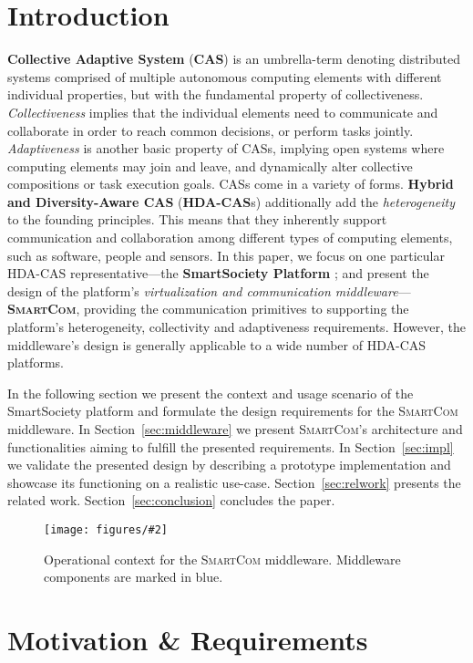 \documentclass{llncs}
\newcommand{\mdl}{\textsc{SmartCom}}
\newcommand{\figcol}[3][0.9]{
\begin{figure}[H] %
\centering
\texttt{[image: figures/\#2]}
\caption{#3}
\label{fig:#2}
\end{figure}
}
\begin{document}
\section{Introduction}
\label{sec:intro}

  \textbf{Collective Adaptive System} (\textbf{CAS}) \cite{FoCASBook} is an umbrella-term denoting distributed systems comprised of multiple autonomous computing elements with different individual properties, but with the fundamental property of collectiveness. \emph{Collectiveness} implies that the individual elements need to communicate and collaborate in order to reach common decisions, or perform tasks jointly. \emph{Adaptiveness} is another basic property of CASs, implying open systems where computing elements may join and leave, and dynamically alter collective compositions or task execution goals. 
  CASs come in a variety of forms. \textbf{Hybrid and Diversity-Aware CAS} (\textbf{HDA-CAS}s) \cite{fausto} additionally add the \emph{heterogeneity} to the founding principles. This means that they inherently support communication and collaboration among different types of computing elements, such as software, people and sensors. 
  In this paper, we focus on one particular HDA-CAS representative---the \textbf{SmartSociety Platform} \cite{SmartSocBook}; and present the design of the platform's \emph{virtualization and communication middleware}---\textbf{\mdl{}}, providing the communication primitives to supporting the platform's heterogeneity, collectivity and adaptiveness requirements. However, the middleware's design is generally applicable to a wide number of HDA-CAS platforms.

  
  In the following section we present the context and usage scenario of the SmartSociety platform and formulate the design requirements for the \mdl{} middleware. In Section~\ref{sec:middleware} we present \mdl's architecture and functionalities aiming to fulfill the presented requirements. In Section~\ref{sec:impl} we validate the presented design by describing a prototype implementation and showcase its functioning on a realistic use-case. Section~\ref{sec:relwork} presents the related work. Section~\ref{sec:conclusion} concludes the paper.

  \figcol[1.0]{smartsoc-highlevel}{Operational context for the \mdl{} middleware. Middleware components are marked in blue.}

  \section{Motivation \& Requirements}
\end{document}
